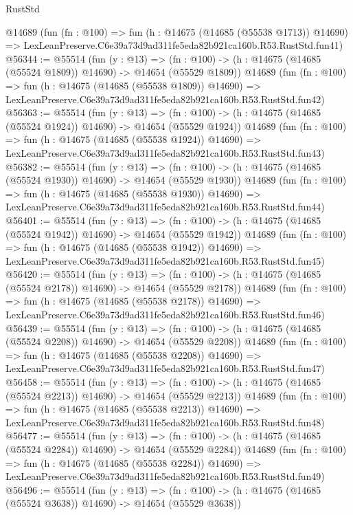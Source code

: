\begin{lexlean}{RustStd}
\begin{coremodule}
    @14689
    (fun (fn : @100) =>
    fun (h : @14675 (@14685 (@55538 @1713)) @14690) =>
    LexLeanPreserve.C6e39a73d9ad311fe5eda82b921ca160b.R53.RustStd.fun41)
@56344 := @55514
    (fun (y : @13) =>
    (fn : @100) -> (h : @14675 (@14685 (@55524 @1809)) @14690) -> @14654 (@55529 @1809))
    @14689
    (fun (fn : @100) =>
    fun (h : @14675 (@14685 (@55538 @1809)) @14690) =>
    LexLeanPreserve.C6e39a73d9ad311fe5eda82b921ca160b.R53.RustStd.fun42)
@56363 := @55514
    (fun (y : @13) =>
    (fn : @100) -> (h : @14675 (@14685 (@55524 @1924)) @14690) -> @14654 (@55529 @1924))
    @14689
    (fun (fn : @100) =>
    fun (h : @14675 (@14685 (@55538 @1924)) @14690) =>
    LexLeanPreserve.C6e39a73d9ad311fe5eda82b921ca160b.R53.RustStd.fun43)
@56382 := @55514
    (fun (y : @13) =>
    (fn : @100) -> (h : @14675 (@14685 (@55524 @1930)) @14690) -> @14654 (@55529 @1930))
    @14689
    (fun (fn : @100) =>
    fun (h : @14675 (@14685 (@55538 @1930)) @14690) =>
    LexLeanPreserve.C6e39a73d9ad311fe5eda82b921ca160b.R53.RustStd.fun44)
@56401 := @55514
    (fun (y : @13) =>
    (fn : @100) -> (h : @14675 (@14685 (@55524 @1942)) @14690) -> @14654 (@55529 @1942))
    @14689
    (fun (fn : @100) =>
    fun (h : @14675 (@14685 (@55538 @1942)) @14690) =>
    LexLeanPreserve.C6e39a73d9ad311fe5eda82b921ca160b.R53.RustStd.fun45)
@56420 := @55514
    (fun (y : @13) =>
    (fn : @100) -> (h : @14675 (@14685 (@55524 @2178)) @14690) -> @14654 (@55529 @2178))
    @14689
    (fun (fn : @100) =>
    fun (h : @14675 (@14685 (@55538 @2178)) @14690) =>
    LexLeanPreserve.C6e39a73d9ad311fe5eda82b921ca160b.R53.RustStd.fun46)
@56439 := @55514
    (fun (y : @13) =>
    (fn : @100) -> (h : @14675 (@14685 (@55524 @2208)) @14690) -> @14654 (@55529 @2208))
    @14689
    (fun (fn : @100) =>
    fun (h : @14675 (@14685 (@55538 @2208)) @14690) =>
    LexLeanPreserve.C6e39a73d9ad311fe5eda82b921ca160b.R53.RustStd.fun47)
@56458 := @55514
    (fun (y : @13) =>
    (fn : @100) -> (h : @14675 (@14685 (@55524 @2213)) @14690) -> @14654 (@55529 @2213))
    @14689
    (fun (fn : @100) =>
    fun (h : @14675 (@14685 (@55538 @2213)) @14690) =>
    LexLeanPreserve.C6e39a73d9ad311fe5eda82b921ca160b.R53.RustStd.fun48)
@56477 := @55514
    (fun (y : @13) =>
    (fn : @100) -> (h : @14675 (@14685 (@55524 @2284)) @14690) -> @14654 (@55529 @2284))
    @14689
    (fun (fn : @100) =>
    fun (h : @14675 (@14685 (@55538 @2284)) @14690) =>
    LexLeanPreserve.C6e39a73d9ad311fe5eda82b921ca160b.R53.RustStd.fun49)
@56496 := @55514
    (fun (y : @13) =>
    (fn : @100) -> (h : @14675 (@14685 (@55524 @3638)) @14690) -> @14654 (@55529 @3638))

\end{coremodule}
\end{lexlean}
